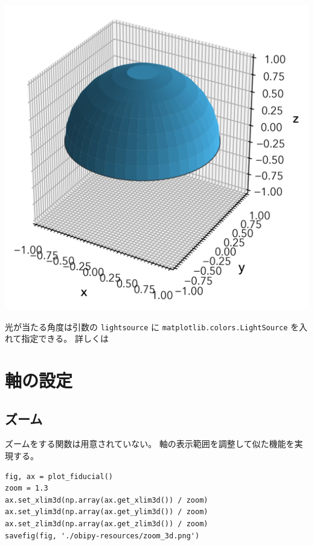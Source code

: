 \documentclass[a4paper, 10pt, notitlepage, twocolumn, uplatex, oneside, dvipdfmx]{jsarticle}
\begin{document}
\label{}
\begin{center}
\includegraphics[width=1.0\linewidth]{./obipy-resources/surface_3d.png}
\end{center}

光が当たる角度は引数の \texttt{lightsource} に \texttt{matplotlib.colors.LightSource} を入れて指定できる。
詳しくは
\section{軸の設定}
\label{sec:org39e21c7}
\subsection{ズーム}
\label{sec:orgac10a95}
ズームをする関数は用意されていない。
軸の表示範囲を調整して似た機能を実現する。
\begin{verbatim}
fig, ax = plot_fiducial()
zoom = 1.3
ax.set_xlim3d(np.array(ax.get_xlim3d()) / zoom)
ax.set_ylim3d(np.array(ax.get_ylim3d()) / zoom)
ax.set_zlim3d(np.array(ax.get_zlim3d()) / zoom)
savefig(fig, './obipy-resources/zoom_3d.png')
\end{verbatim}
\end{document}
